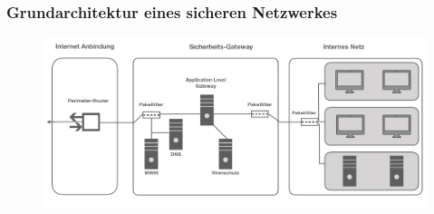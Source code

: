 \documentclass[hyperref={pdfpagelabels=false},xcolor=dvipsnames]{beamer}
\begin{document}
\begin{frame}
	\frametitle{Grundarchitektur eines sicheren Netzwerkes}
	\begin{figure}
	\includegraphics[width=\textwidth]{grundarchitektur.jpeg}	
	\end{figure}
		
\end{frame}
\end{document}
